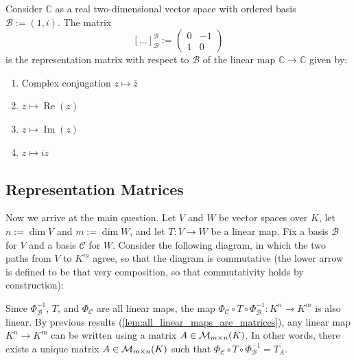 \begin{exercise}
\label{exc:complex_multiplication_real_linear_map_sc}
Consider $\mathbb{C}$ as a real two-dimensional vector space with ordered basis $\mathcal{B} := (1, i)$. The matrix
\[
[\dots]_{\mathcal{B}}^{\mathcal{B}} := \begin{pmatrix} 0 & -1 \\ 1 & 0 \end{pmatrix}
\]
is the representation matrix with respect to $\mathcal{B}$ of the linear map $\mathbb{C} \to \mathbb{C}$ given by:
\begin{enumerate}
    \item Complex conjugation $z \mapsto \bar{z}$
    \item $z \mapsto \operatorname{Re}(z)$
    \item $z \mapsto \operatorname{Im}(z)$
    \item $z \mapsto iz$
\end{enumerate}
\end{exercise}

\subsection{Representation Matrices}

Now we arrive at the main question. Let $V$ and $W$ be vector spaces over $K$, let $n := \dim V$ and $m := \dim W$, and let $T: V \to W$ be a linear map. Fix a basis $\mathcal{B}$ for $V$ and a basis $\mathcal{C}$ for $W$. Consider the following diagram, in which the two paths from $V$ to $K^m$ agree, so that the diagram is commutative (the lower arrow is defined to be that very composition, so that commutativity holds by construction):
\begin{center}
\end{center}
Since $\Phi_{\mathcal{B}}^{-1}$, $T$, and $\Phi_{\mathcal{C}}$ are all linear maps, the map $\Phi_{\mathcal{C}} \circ T \circ \Phi_{\mathcal{B}}^{-1}: K^n \to K^m$ is also linear. By previous results (\cref{lem:all_linear_maps_are_matrices}), any linear map $K^n \to K^m$ can be written using a matrix $A \in \mathcal{M}_{m \times n}(K)$. In other words, there exists a unique matrix $A \in \mathcal{M}_{m \times n}(K)$ such that $\Phi_{\mathcal{C}} \circ T \circ \Phi_{\mathcal{B}}^{-1} = T_A$.


